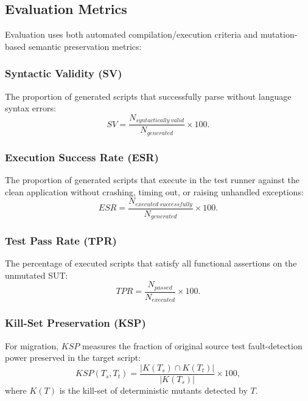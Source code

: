 \documentclass[pdflatex,sn-mathphys-num]{sn-jnl}
\begin{document}
\subsection{Evaluation Metrics}
\label{subsec:evaluation-metrics}

Evaluation uses both automated compilation/execution criteria and mutation-based
semantic preservation metrics:

\subsubsection{Syntactic Validity (SV)}
The proportion of generated scripts that successfully parse without language syntax errors:
\begin{equation}
    SV = \frac{N_{syntactically\ valid}}{N_{generated}} \times 100.
\end{equation}

\subsubsection{Execution Success Rate (ESR)}
The proportion of generated scripts that execute in the test runner against the clean application without crashing, timing out, or raising unhandled exceptions:
\begin{equation}
    ESR = \frac{N_{executed\ successfully}}{N_{generated}} \times 100.
\end{equation}

\subsubsection{Test Pass Rate (TPR)}
The percentage of executed scripts that satisfy all functional assertions on the unmutated SUT:
\begin{equation}
    TPR = \frac{N_{passed}}{N_{executed}} \times 100.
\end{equation}

\subsubsection{Kill-Set Preservation (KSP)}
For migration, $KSP$ measures the fraction of original source test fault-detection power preserved in the target script:
\begin{equation}
    KSP(T_s, T_t) = \frac{|K(T_s) \cap K(T_t)|}{|K(T_s)|} \times 100,
\end{equation}
where $K(T)$ is the kill-set of deterministic mutants detected by $T$.
\end{document}
